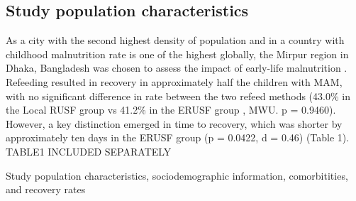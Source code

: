 \documentclass{article}
\begin{document}
\subsection*{Study population characteristics}
As a city with the second highest density of population and in a country with childhood malnutrition rate is one of the highest globally, the Mirpur region in Dhaka, Bangladesh was chosen to assess the impact of early-life malnutrition \cite{ahmed2012nutrition}.
Refeeding resulted in recovery in approximately half the children with MAM, with no significant difference in rate between the two refeed methods (43.0\% in the Local RUSF group vs 41.2\% in the ERUSF group , MWU. p = 0.9460).
However, a key distinction emerged in time to recovery, which was shorter by approximately ten days in the ERUSF group (p = 0.0422, d = 0.46) (Table 1).
TABLE1 INCLUDED SEPARATELY

\begin{table}[h!]
	\centering
	\caption{Study population characteristics, sociodemographic information, comorbitities, and recovery rates}
	\label{Table1}
\end{table}
\end{document}
